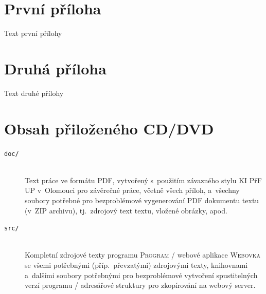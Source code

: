 \documentclass[
  field=inf,
  biblatex,
  glossaries,
  index
]{kidiplom}
\begin{document}
\appendix

\section{První příloha}
Text první přílohy

\section{Druhá příloha}
Text druhé přílohy

\section{Obsah přiloženého CD/DVD} \label{sec:ObsahCD}

\begin{description}

\item[\texttt{doc/}] \hfill \\
  Text práce ve formátu PDF, vytvořený s~použitím závazného stylu KI
  PřF UP v~Olomouci pro závěrečné práce, včetně všech příloh,
  a~všechny soubory potřebné pro bezproblémové vygenerování PDF
  dokumentu textu (v~ZIP archivu), tj.~zdrojový text textu, vložené
  obrázky, apod.

\item[\texttt{src/}] \hfill \\
  Kompletní zdrojové texty programu \textsc{Program} / webové aplikace
  \textsc{Webovka} se všemi potřebnými (příp.~převzatými) zdrojovými
  texty, knihovnami a~dalšími soubory potřebnými pro bezproblémové
  vytvoření spustitelných verzí programu / adresářové struktury pro
  zkopírování na webový server.

\end{description}


\printglossary


\nocite{*}
\printbibliography
\end{document}
